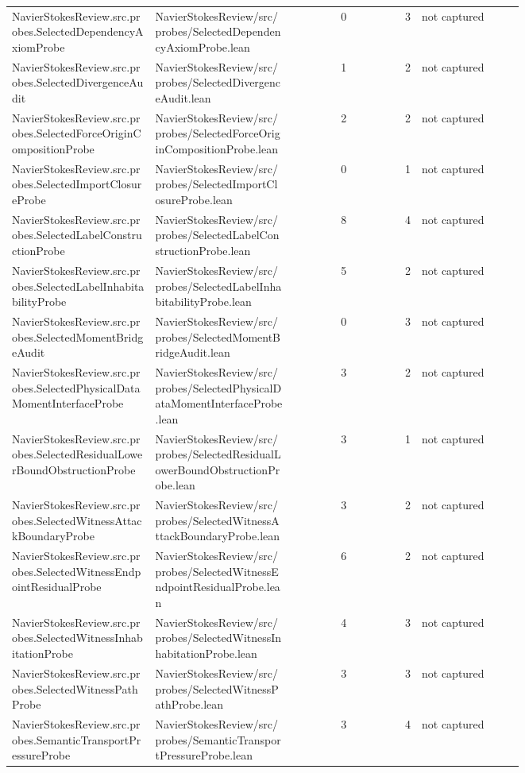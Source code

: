 \documentclass[10pt]{article}
\begin{document}
\begin{longtable}{p{0.28\linewidth}p{0.27\linewidth}r r p{0.20\linewidth}}
NavierStokesReview.src.probes.SelectedDependencyAxiomProbe & NavierStokesReview/src/probes/SelectedDependencyAxiomProbe.lean & 0 & 3 & not captured\\
NavierStokesReview.src.probes.SelectedDivergenceAudit & NavierStokesReview/src/probes/SelectedDivergenceAudit.lean & 1 & 2 & not captured\\
NavierStokesReview.src.probes.SelectedForceOriginCompositionProbe & NavierStokesReview/src/probes/SelectedForceOriginCompositionProbe.lean & 2 & 2 & not captured\\
NavierStokesReview.src.probes.SelectedImportClosureProbe & NavierStokesReview/src/probes/SelectedImportClosureProbe.lean & 0 & 1 & not captured\\
NavierStokesReview.src.probes.SelectedLabelConstructionProbe & NavierStokesReview/src/probes/SelectedLabelConstructionProbe.lean & 8 & 4 & not captured\\
NavierStokesReview.src.probes.SelectedLabelInhabitabilityProbe & NavierStokesReview/src/probes/SelectedLabelInhabitabilityProbe.lean & 5 & 2 & not captured\\
NavierStokesReview.src.probes.SelectedMomentBridgeAudit & NavierStokesReview/src/probes/SelectedMomentBridgeAudit.lean & 0 & 3 & not captured\\
NavierStokesReview.src.probes.SelectedPhysicalDataMomentInterfaceProbe & NavierStokesReview/src/probes/SelectedPhysicalDataMomentInterfaceProbe.lean & 3 & 2 & not captured\\
NavierStokesReview.src.probes.SelectedResidualLowerBoundObstructionProbe & NavierStokesReview/src/probes/SelectedResidualLowerBoundObstructionProbe.lean & 3 & 1 & not captured\\
NavierStokesReview.src.probes.SelectedWitnessAttackBoundaryProbe & NavierStokesReview/src/probes/SelectedWitnessAttackBoundaryProbe.lean & 3 & 2 & not captured\\
NavierStokesReview.src.probes.SelectedWitnessEndpointResidualProbe & NavierStokesReview/src/probes/SelectedWitnessEndpointResidualProbe.lean & 6 & 2 & not captured\\
NavierStokesReview.src.probes.SelectedWitnessInhabitationProbe & NavierStokesReview/src/probes/SelectedWitnessInhabitationProbe.lean & 4 & 3 & not captured\\
NavierStokesReview.src.probes.SelectedWitnessPathProbe & NavierStokesReview/src/probes/SelectedWitnessPathProbe.lean & 3 & 3 & not captured\\
NavierStokesReview.src.probes.SemanticTransportPressureProbe & NavierStokesReview/src/probes/SemanticTransportPressureProbe.lean & 3 & 4 & not captured\\

\end{longtable}
\end{document}

